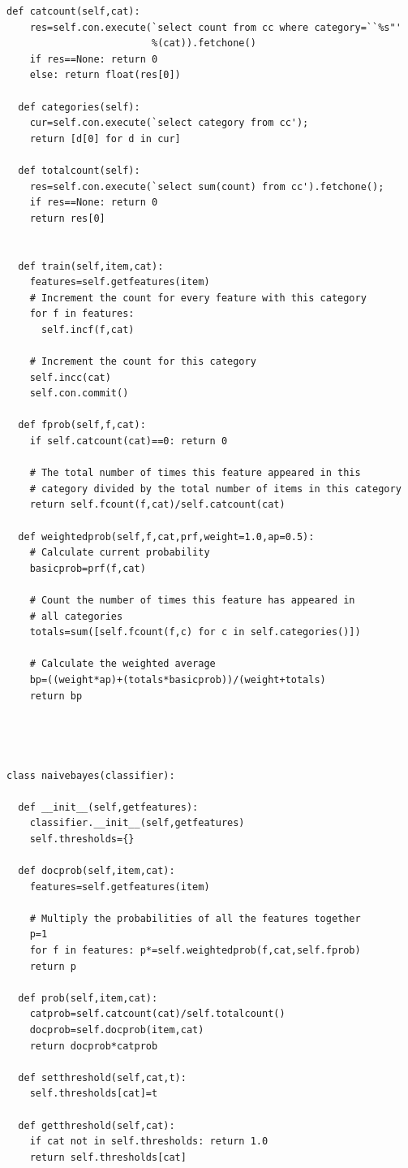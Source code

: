 \documentclass{article}
\begin{document}
\begin{lstlisting}[frame=single, caption=docclass.py, label=docclass]
  def catcount(self,cat):
    res=self.con.execute(`select count from cc where category=``%s"'
                         %(cat)).fetchone()
    if res==None: return 0
    else: return float(res[0])

  def categories(self):
    cur=self.con.execute(`select category from cc');
    return [d[0] for d in cur]

  def totalcount(self):
    res=self.con.execute(`select sum(count) from cc').fetchone();
    if res==None: return 0
    return res[0]


  def train(self,item,cat):
    features=self.getfeatures(item)
    # Increment the count for every feature with this category
    for f in features:
      self.incf(f,cat)

    # Increment the count for this category
    self.incc(cat)
    self.con.commit()

  def fprob(self,f,cat):
    if self.catcount(cat)==0: return 0

    # The total number of times this feature appeared in this 
    # category divided by the total number of items in this category
    return self.fcount(f,cat)/self.catcount(cat)

  def weightedprob(self,f,cat,prf,weight=1.0,ap=0.5):
    # Calculate current probability
    basicprob=prf(f,cat)

    # Count the number of times this feature has appeared in
    # all categories
    totals=sum([self.fcount(f,c) for c in self.categories()])

    # Calculate the weighted average
    bp=((weight*ap)+(totals*basicprob))/(weight+totals)
    return bp




class naivebayes(classifier):
  
  def __init__(self,getfeatures):
    classifier.__init__(self,getfeatures)
    self.thresholds={}
  
  def docprob(self,item,cat):
    features=self.getfeatures(item)   

    # Multiply the probabilities of all the features together
    p=1
    for f in features: p*=self.weightedprob(f,cat,self.fprob)
    return p

  def prob(self,item,cat):
    catprob=self.catcount(cat)/self.totalcount()
    docprob=self.docprob(item,cat)
    return docprob*catprob
  
  def setthreshold(self,cat,t):
    self.thresholds[cat]=t
    
  def getthreshold(self,cat):
    if cat not in self.thresholds: return 1.0
    return self.thresholds[cat]
  

\end{lstlisting}
\end{document}
